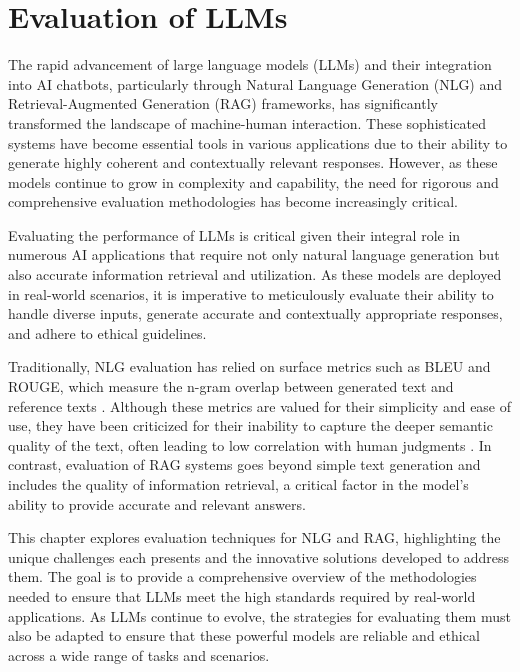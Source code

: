 \section{Evaluation of LLMs}



The rapid advancement of large language models (LLMs) and their integration into AI chatbots, particularly through Natural Language Generation (NLG) and Retrieval-Augmented Generation (RAG) frameworks, has significantly transformed the landscape of machine-human interaction. These sophisticated systems have become essential tools in various applications due to their ability to generate highly coherent and contextually relevant responses. However, as these models continue to grow in complexity and capability, the need for rigorous and comprehensive evaluation methodologies has become increasingly critical.

Evaluating the performance of LLMs is critical given their integral role in numerous AI applications that require not only natural language generation but also accurate information retrieval and utilization. As these models are deployed in real-world scenarios, it is imperative to meticulously evaluate their ability to handle diverse inputs, generate accurate and contextually appropriate responses, and adhere to ethical guidelines.

Traditionally, NLG evaluation has relied on surface metrics such as BLEU and ROUGE, which measure the n-gram overlap between generated text and reference texts \cite{papineni2002bleu, lin2004rouge}. Although these metrics are valued for their simplicity and ease of use, they have been criticized for their inability to capture the deeper semantic quality of the text, often leading to low correlation with human judgments \cite{sulem2018bleu}. In contrast, evaluation of RAG systems goes beyond simple text generation and includes the quality of information retrieval, a critical factor in the model's ability to provide accurate and relevant answers.

This chapter explores evaluation techniques for NLG and RAG, highlighting the unique challenges each presents and the innovative solutions developed to address them. The goal is to provide a comprehensive overview of the methodologies needed to ensure that LLMs meet the high standards required by real-world applications. As LLMs continue to evolve, the strategies for evaluating them must also be adapted to ensure that these powerful models are reliable and ethical across a wide range of tasks and scenarios.

